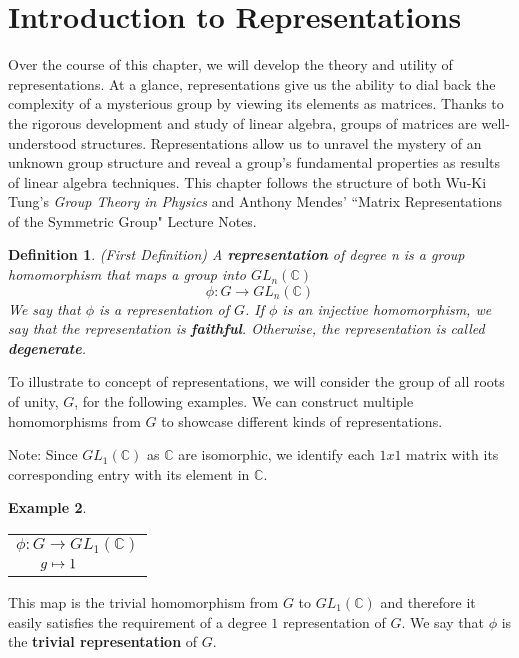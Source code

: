 \documentclass[10pt]{ucthesis}
\newtheorem{definition}{Definition}[chapter]
\newtheorem{example}[definition]{Example}
\begin{document}
\section{Introduction to Representations}

Over the course of this chapter, we will develop the theory and utility of representations. At a glance, representations give us the ability to dial back the complexity of a mysterious group by viewing its elements as matrices. Thanks to the rigorous development and study of linear algebra, groups of matrices are well-understood structures. Representations allow us to unravel the mystery of an unknown group structure and reveal a group's fundamental properties as results of linear algebra techniques. This chapter follows the structure of both Wu-Ki Tung's \textit{Group Theory in Physics} and Anthony Mendes' ``Matrix Representations of the Symmetric Group" Lecture Notes. \cite{Tung,Mendes}

\begin{definition}
	(First Definition) A \textbf{representation} of degree n is a group homomorphism that maps a group into $GL_n(\mathbb{C})$
	$$\phi:G\rightarrow GL_n(\mathbb{C})$$
	We say that $\phi$ is a representation of $G$. If $\phi$ is an injective homomorphism, we say that the representation is \textbf{faithful}. Otherwise, the representation is called \textbf{degenerate}.
\end{definition}

To illustrate to concept of representations, we will consider the group of all roots of unity, $G$, for the following examples. We can construct multiple homomorphisms from $G$ to showcase different kinds of representations. 

\noindent Note: Since $GL_1(\mathbb{C})$ as $\mathbb{C}$ are isomorphic, we identify each $1x1$ matrix with its corresponding entry with its element in $\mathbb{C}$.

\begin{example}\end{example}\renewcommand{\arraystretch}{0.7}\begin{center}
			\begin{tabular}{l}$\phi:G\rightarrow GL_1(\mathbb{C})$\\
			$\hspace{6mm}g\mapsto 1$
			\end{tabular}
		\end{center}


	

\noindent This map is the trivial homomorphism from $G$ to $GL_1(\mathbb{C})$ and therefore it easily satisfies the requirement of a degree $1$ representation of $G$. We say that $\phi$ is the \textbf{trivial representation} of $G$.
\end{document}
